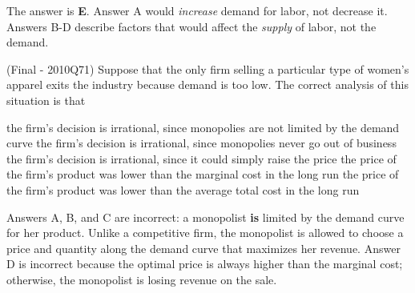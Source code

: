 \documentclass{exam}
\begin{document}
\begin{questions}
\begin{solution} The answer is \textbf{E}. Answer A would \textit{increase} demand for labor, not decrease it. Answers B-D describe factors that would affect the \textit{supply} of labor, not the demand. \end{solution}

\question (Final - 2010Q71) Suppose that the only firm selling a particular type of women's apparel exits the industry because demand is too low. The correct analysis of this situation is that 
\begin{choices}
\choice the firm’s decision is irrational, since monopolies are not limited by the demand curve
\choice the firm’s decision is irrational, since monopolies never go out of business
\choice the firm’s decision is irrational, since it could simply raise the price
\choice the price of the firm’s product was lower than the marginal cost in the long run
\CorrectChoice the price of the firm’s product was lower than the average total cost in the long run 
\end{choices}

\begin{solution} Answers A, B, and C are incorrect: a monopolist \textbf{is} limited by the demand curve for her product. Unlike a competitive firm, the monopolist is allowed to choose a price and quantity along the demand curve that maximizes her revenue. Answer D is incorrect because the optimal price is always higher than the marginal cost; otherwise, the monopolist is losing revenue on the sale. \end{solution}

\end{questions}
\end{document}
